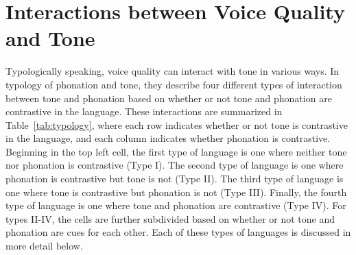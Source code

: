
\section{Interactions between Voice Quality and Tone} \label{sec:interactions_between_voice_quality_and_tone}

Typologically speaking, voice quality can interact with tone in various ways. In  typology of phonation and tone, they describe four different types of interaction between tone and phonation based on whether or not tone and phonation are contrastive in the language. These interactions are summarized in Table~\ref{tab:typology}, where each row indicates whether or not tone is contrastive in the language, and each column indicates whether phonation is contrastive. Beginning in the top left cell, the first type of language is one where neither tone nor phonation is contrastive (Type I). The second type of language is one where phonation is contrastive but tone is not (Type II). The third type of language is one where tone is contrastive but phonation is not (Type III). Finally, the fourth type of language is one where tone and phonation are contrastive (Type IV). For types II-IV, the cells are further subdivided based on whether or not tone and phonation are cues for each other. Each of these types of languages is discussed in more detail below.


